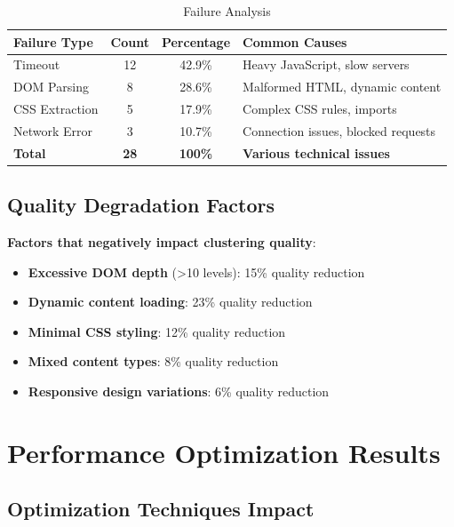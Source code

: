 \begin{table}[htbp]
    \centering
    \caption{Failure Analysis}
    \label{tab:failure-analysis}
    \begin{tabular}{|l|c|c|l|}
        \hline
        \textbf{Failure Type} & \textbf{Count} & \textbf{Percentage} & \textbf{Common Causes} \\
        \hline
        Timeout & 12 & 42.9\% & Heavy JavaScript, slow servers \\
        DOM Parsing & 8 & 28.6\% & Malformed HTML, dynamic content \\
        CSS Extraction & 5 & 17.9\% & Complex CSS rules, imports \\
        Network Error & 3 & 10.7\% & Connection issues, blocked requests \\
        \hline
        \textbf{Total} & \textbf{28} & \textbf{100\%} & \textbf{Various technical issues} \\
        \hline
    \end{tabular}
\end{table}

\subsection{Quality Degradation Factors}
\label{subsec:quality-degradation}

\textbf{Factors that negatively impact clustering quality}:
\begin{itemize}
    \item \textbf{Excessive DOM depth} (>10 levels): 15\% quality reduction
    \item \textbf{Dynamic content loading}: 23\% quality reduction
    \item \textbf{Minimal CSS styling}: 12\% quality reduction
    \item \textbf{Mixed content types}: 8\% quality reduction
    \item \textbf{Responsive design variations}: 6\% quality reduction
\end{itemize}

\section{Performance Optimization Results}
\label{sec:optimization-results}

\subsection{Optimization Techniques Impact}
\label{subsec:optimization-impact}

